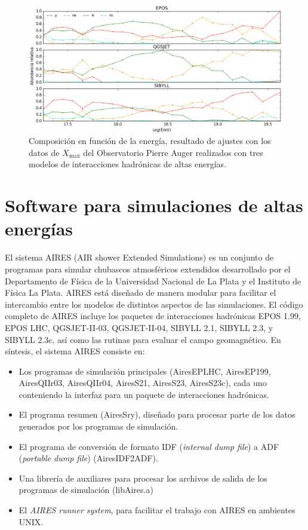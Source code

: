 \begin{center}
\begin{figure}[h]
\centering
\includegraphics[height=0.3\textheight]{Figuras/composition.png} 
\caption{Composición en función de la energía, resultado de ajustes con los datos de $X_{\text{max}}$ del Observatorio Pierre Auger realizados con tres modelos de interacciones hadrónicas de altas energías.}
\label{fig:composition}
\end{figure}	
\end{center}

\section{Software para simulaciones de altas energías}
El sistema AIRES (AIR shower Extended Simulations) es un conjunto de programas para simular chubascos atmosféricos extendidos desarrollado por el Departamento de Física de la Universidad Nacional de La Plata y el Instituto de Física La Plata. AIRES está diseñado de manera modular para facilitar el intercambio entre los modelos de distintos aspectos de las simulaciones. El código completo de AIRES incluye los paquetes de interacciones hadrónicas EPOS 1.99, EPOS LHC, QGSJET-II-03, QGSJET-II-04, SIBYLL 2.1, SIBYLL 2.3, y SIBYLL 2.3c, así como las rutinas para evaluar el campo geomagnético. En síntesis, el sistema AIRES consiste en:
	\begin{itemize}
	\item Los programas de simulación principales (AiresEPLHC, AiresEP199, AiresQIIr03, AiresQIIr04, AiresS21, AiresS23, AiresS23c), cada uno conteniendo la interfaz para un paquete de interacciones hadrónicas.
	\item El programa resumen (AiresSry), diseñado para procesar parte de los datos generados por los programas de simulación.
	\item El programa de conversión de formato IDF (\textit{internal dump file}) a ADF (\textit{portable dump file}) (AiresIDF2ADF).
	\item Una librería de auxiliares para procesar los archivos de salida de los programas de simulación (libAires.a)
	\item El \textit{AIRES runner system}, para facilitar el trabajo con AIRES en ambientes UNIX. 
	\end{itemize}
	
